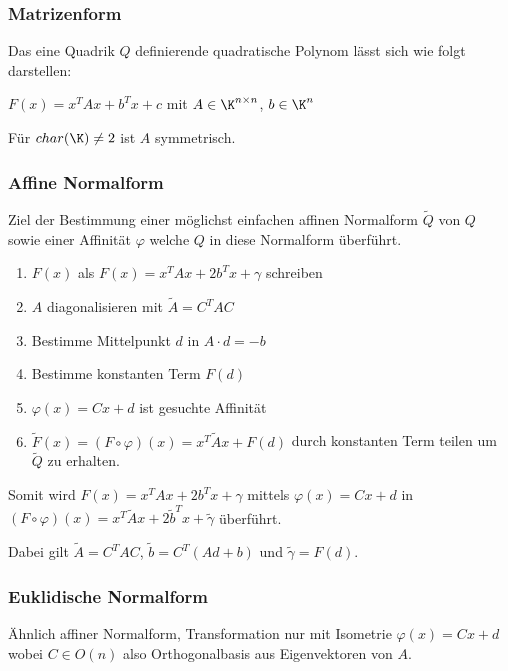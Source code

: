 \subsubsection*{Matrizenform}

Das eine Quadrik $Q$ definierende quadratische Polynom lässt sich wie folgt darstellen:

$F(x) = x^TAx + b^Tx + c$ mit $A \in \K^{n\times n}$, $b \in \K^n$

Für $char(\K)\neq 2$ ist $A$ symmetrisch.

\subsubsection*{Affine Normalform}

Ziel der Bestimmung einer möglichst einfachen affinen Normalform $\tilde Q$ von $Q$ sowie einer Affinität $\varphi$ welche $Q$ in diese Normalform überführt.

\begin{enumerate}[leftmargin=4mm]
	\item $F(x)$ als $F(x) = x^TAx + 2b^Tx + \gamma$ schreiben
	\item $A$ diagonalisieren mit $\tilde A = C^TAC$
	\item Bestimme Mittelpunkt $d$ in $A \cdot d=-b$
	\item Bestimme konstanten Term $F(d)$
	\item $\varphi(x)=Cx+d$ ist gesuchte Affinität
	\item $\tilde F(x) = (F \circ \varphi)(x) = x^T\tilde Ax+F(d)$ durch konstanten Term teilen um $\tilde Q$ zu erhalten.
\end{enumerate}

Somit wird $F(x)=x^TAx+2b^Tx+\gamma$ mittels $\varphi(x)=Cx+d$ in $(F \circ \varphi)(x)=x^T\tilde Ax+2\tilde b^Tx + \tilde\gamma$ überführt.

Dabei gilt $\tilde A = C^TAC$, $\tilde b = C^T(Ad+b)$ und $\tilde\gamma = F(d)$.

\subsubsection*{Euklidische Normalform}

Ähnlich affiner Normalform, Transformation nur mit Isometrie $\varphi(x)=Cx+d$ wobei $C \in O(n)$ also Orthogonalbasis aus Eigenvektoren von $A$.

